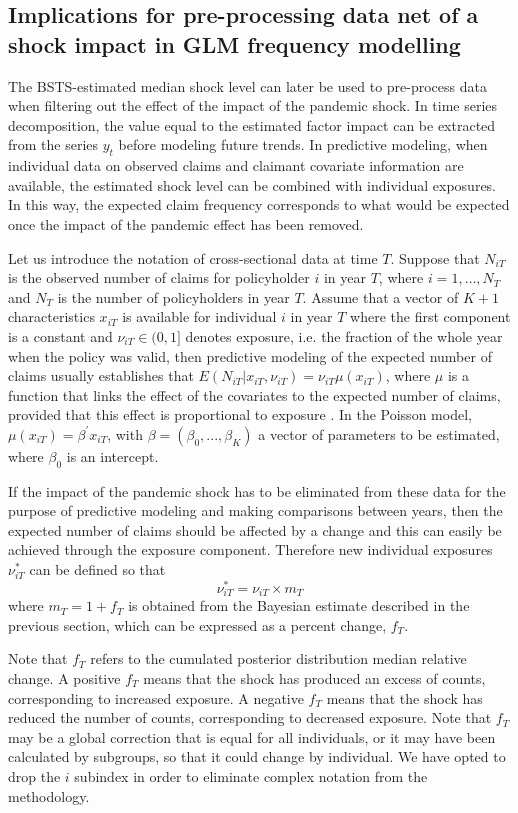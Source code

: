 \documentclass[]{risa}
\begin{document}
\subsection{Implications for pre-processing data net of a shock impact in GLM frequency modelling}

The BSTS-estimated median shock level can later be used to pre-process data when filtering out the effect of the impact of the pandemic shock. In time series decomposition, the value equal to the estimated factor impact can be extracted from the series $y_t$ before modeling future trends. In predictive modeling, when individual data on observed claims and claimant covariate information are available, the estimated shock level can be combined with individual exposures. In this way, the expected claim frequency corresponds to what would be expected once the impact of the pandemic effect has been removed.

Let us introduce the notation of cross-sectional data at time $T$. Suppose that $N_{iT}$ is the observed number of claims for policyholder $i$ in year $T$, where $i=1,\dots, N_T$ and $N_T$ is the number of policyholders in year $T$. Assume that a vector of $K+1$ characteristics $x_{iT}$ is available for individual $i$ in year $T$ where the first component is a constant and $\nu_{iT} \in (0,1]$ denotes exposure, i.e. the fraction of the whole year when the policy was valid, then predictive modeling of the expected number of claims usually establishes that $E(N_{iT}|x_{iT}, \nu_{iT})= \nu_{iT}\mu(x_{iT})$, where $\mu$ is a function that links the effect of the covariates to the expected number of claims, provided that this effect is proportional to exposure \cite{wuthrich2023statistical}. In the Poisson model, $\mu(x_{iT})=\beta^\prime x_{iT}$, with $\beta = (\beta_0,...,\beta_K)$ a vector of parameters to be estimated, where $\beta_0$ is an intercept.

If the impact of the pandemic shock has to be eliminated from these data for the purpose of predictive modeling and making comparisons between years, then the expected number of claims should be affected by a change and this can easily be achieved through the exposure component. Therefore new individual exposures $\nu^*_{iT}$ can be defined so that
$$
\nu^*_{iT}=\nu_{iT} \times m_T
$$
where $m_T=1+f_T$ is obtained from the Bayesian estimate described in the previous section, which can be expressed as a percent change, $f_T$. 

Note that $f_T$ refers to the cumulated posterior distribution median relative change. A positive $f_T$ means that the shock has produced an excess of counts, corresponding to increased exposure. A negative $f_T$ means that the shock has reduced the number of counts, corresponding to decreased exposure. Note that $f_T$ may be a global correction that is equal for all individuals, or it may have been calculated by subgroups, so that it could change by individual. We have opted to drop the $i$ subindex in order to eliminate complex notation from the methodology.
\end{document}

